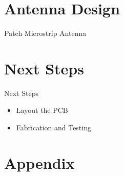 \documentclass{beamer}
\begin{document}

\section{Antenna Design}
\begin{frame}{Patch Microstrip Antenna}
  
\end{frame}



\section{Next Steps}

\begin{frame}{Next Steps}
\begin{itemize}
  \item <1-> Layout the PCB
  \item <2-> Fabrication and Testing
\end{itemize}
\end{frame}

\section*{Appendix}
\end{document}
